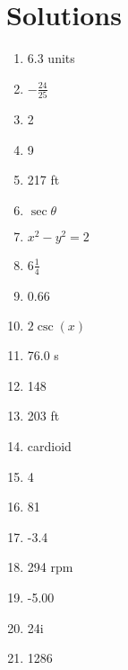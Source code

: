 \documentclass[../uilmath.tex]{subfiles}
\begin{document}
\section*{Solutions}
\begin{enumerate}[label=\bfseries\arabic*.]
    \item %
    6.3 units 

    \item %
    $-\frac{24}{25}$

    \item %
    2

    \item %
    9

    \item %
    217 ft 

    \item %
    $\sec\theta$

    \item %
    $x^2-y^2=2$

    \item %
    $6\frac{1}{4}$

    \item %
    0.66

    \item %
    $2\csc(x)$

    \item %
    76.0 s 
    
    \item %
    148

    \item %
    203 ft

    \item %
    cardioid

    \item %
    4

    \item %
    81

    \item %
    -3.4

    \item %
    294 rpm 

    \item %
    -5.00 

    \item %
    24i

    \item %
    1286


\end{enumerate}
\end{document}

